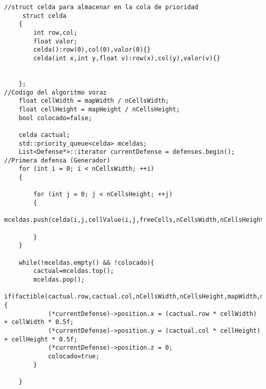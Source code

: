 \begin{lstlisting}
//struct celda para almacenar en la cola de prioridad
     struct celda
    {
    	int row,col;
    	float valor;
    	celda():row(0),col(0),valor(0){}
    	celda(int x,int y,float v):row(x),col(y),valor(v){}
    

    };
//Codigo del algoritmo voraz
    float cellWidth = mapWidth / nCellsWidth;
    float cellHeight = mapHeight / nCellsHeight;
    bool colocado=false;

    celda cactual;
    std::priority_queue<celda> mceldas;
    List<Defense*>::iterator currentDefense = defenses.begin(); //Primera defensa (Generador)
    for (int i = 0; i < nCellsWidth; ++i)
    {
        
    	for (int j = 0; j < nCellsHeight; ++j)
    	{
    		mceldas.push(celda(i,j,cellValue(i,j,freeCells,nCellsWidth,nCellsHeight,mapWidth,mapHeight,obstacles,defenses)));	
    		
    	}
    }

    while(!mceldas.empty() && !colocado){
    	cactual=mceldas.top();
        mceldas.pop();
    	if(factible(cactual.row,cactual.col,nCellsWidth,nCellsHeight,mapWidth,mapHeight,obstacles,defenses,currentDefense)){
    		(*currentDefense)->position.x = (cactual.row * cellWidth) + cellWidth * 0.5f;
        	(*currentDefense)->position.y = (cactual.col * cellHeight) + cellHeight * 0.5f;
        	(*currentDefense)->position.z = 0; 
            colocado=true;
    	}

    }
\end{lstlisting}
